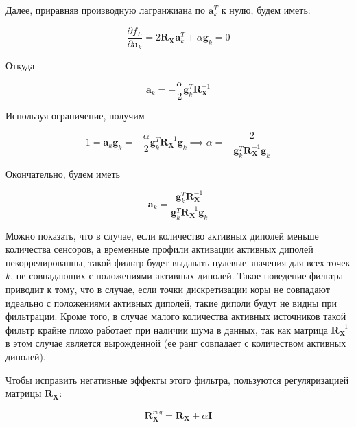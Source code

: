Далее, приравняв производную лагранжиана по $\mathbf{a}_k ^ T$ к нулю, будем иметь:

\begin{equation}
    \frac{\partial f_L}{\partial \mathbf{a}_k} = 
    2 \mathbf{R}_{\mathbf{X}} \mathbf{a}_k^T + \alpha \mathbf{g}_k = 0
\end{equation}

Откуда

\begin{equation}
    \mathbf{a}_k = - \frac{\alpha}{2} \mathbf{g}_k^T\mathbf{R}_{\mathbf{X}}^{-1}
\end{equation}

Используя ограничение, получим

\begin{equation}
    1 = \mathbf{a}_k \mathbf{g}_k =
    - \frac{\alpha}{2} \mathbf{g}_k^T\mathbf{R}_{\mathbf{X}}^{-1} \mathbf{g}_k \implies
    \alpha = -\frac{2}{\mathbf{g}_k^T \mathbf{R}_{\mathbf{X}}^{-1} \mathbf{g}_k}
\end{equation}

Окончательно, будем иметь

\begin{equation}
    \mathbf{a}_k =
    \frac{\mathbf{g}_k^T \mathbf{R}_{\mathbf{X}}^{-1}}{\mathbf{g}_k^T \mathbf{R}_{\mathbf{X}}^{-1} \mathbf{g}_k}
    \label{lcmv_filters}
\end{equation}

Можно показать, что в случае, если количество активных диполей меньше количества сенсоров,
а временные профили активации активных диполей некоррелированны,
такой фильтр будет выдавать нулевые значения для всех точек $k$, не совпадающих
с положениями активных диполей.
Такое поведение фильтра приводит к тому, что в случае, если точки дискретизации коры не
совпадают идеально с положениями активных диполей, такие диполи будут не видны при
фильтрации.
Кроме того, в случае малого количества активных источников такой фильтр
крайне плохо работает при наличии шума в данных, так как матрица $\mathbf{R}_{\mathbf{X}}^{-1}$
в этом случае является вырожденной (ее ранг совпадает с количеством активных диполей).

Чтобы исправить негативные эффекты этого фильтра, пользуются регуляризацией матрицы $\mathbf{R}_{\mathbf{X}}$:

\begin{equation}
    \mathbf{R}_{\mathbf{X}}^{reg} = \mathbf{R}_\mathbf{X} + \alpha \mathbf{I}
\end{equation}

